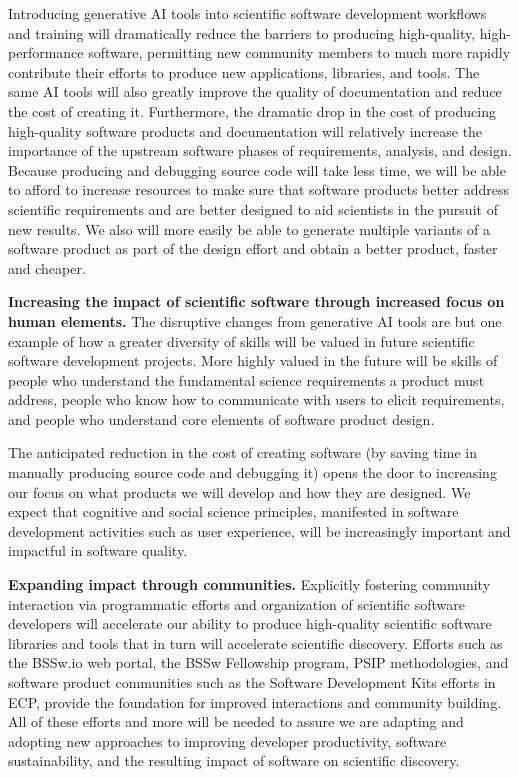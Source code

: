Introducing generative AI tools into scientific software development workflows and training will dramatically reduce the barriers to producing high-quality, high-performance software, permitting new community members to much more rapidly contribute their efforts to produce new applications, libraries, and tools.  The same AI tools will also greatly improve the quality of documentation and reduce the cost of creating it.
Furthermore, the dramatic drop in the cost of producing high-quality software products and documentation will relatively increase the importance of the upstream software phases of requirements, analysis, and design.  Because producing and debugging source code will take less time, we will be able to afford to increase resources to make sure that software products better address scientific requirements and are better designed to aid scientists in the pursuit of new results.  We also will more easily be able to generate multiple variants of a software product as part of the design effort and obtain a better product, faster and cheaper.

{\bf Increasing the impact of scientific software through increased focus on human elements.}
The disruptive changes from generative AI tools are but one example of how a greater diversity of skills will be valued in future scientific software development projects.  More highly valued in the future will be skills of people who understand the fundamental science requirements a product must address, people who know how to communicate with users to elicit requirements, and people who understand core elements of software product design.  

The anticipated reduction in the cost of creating software (by saving time in manually producing source code and debugging it) opens the door to increasing our focus on what products we will develop and how they are designed.  We expect that cognitive and social science principles, manifested in software development activities such as user experience, will be increasingly important and impactful in software quality.

{\bf Expanding impact through communities.}
Explicitly fostering community interaction via programmatic efforts and organization of scientific software developers will accelerate our ability to produce high-quality scientific software libraries and tools that in turn will accelerate scientific discovery.  Efforts such as the BSSw.io web portal, the BSSw Fellowship program, PSIP methodologies, and software product communities such as the Software Development Kits efforts in ECP, provide the foundation for improved interactions and community building.  All of these efforts and more will be needed to assure we are adapting and adopting new approaches to improving developer productivity, software sustainability, and the resulting impact of software on scientific discovery. 

